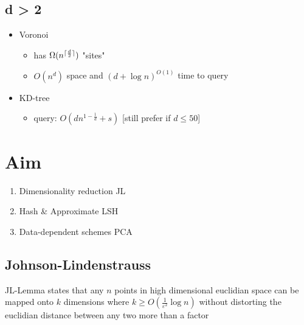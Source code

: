 \documentclass[12pt]{article}
\DeclarePairedDelimiter{\ceil}{\lceil}{\rceil}
\begin{document}
\subsection{d > 2}
\begin{itemize}
	\item Voronoi
	\begin{itemize}
		\item has $\Omega (n^{\ceil{\frac{d}{2}}})$ "sites"
			\item $O(n^d)$ space and $(d+\log n)^{O(1)}$ time to query
	\end{itemize}
	\item KD-tree
	\begin{itemize}
		\item query: $O(dn^{1-\frac1d}+s)$ [still prefer if $d\leq50$]
	\end{itemize}
\end{itemize}
\section{Aim}
\begin{enumerate}[align=left, labelwidth=1ex, start=1,label={\#\arabic*}]
	\item Dimensionality reduction JL
	\item Hash \& Approximate LSH
	\item Data-dependent schemes PCA
\end{enumerate}

\subsection{Johnson-Lindenstrauss}

JL-Lemma states that any $n$ points in high dimensional euclidian space can be mapped onto $k$ dimensions where $k \geq O(\frac1{\varepsilon^2}\log n )$ without distorting the euclidian distance between any two more than a factor 
\end{document}
